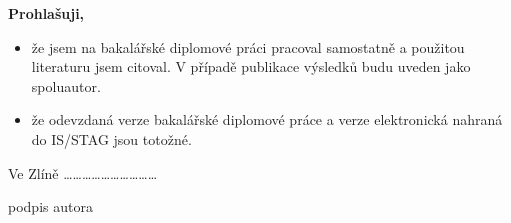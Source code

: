 {{	\bigskip
	
	
	\textbf{Prohlašuji,}
	
	\begin{itemize}
		\setlength{\parskip}{0pt}
		\setlength{\itemsep}{0pt}
		\item{že jsem na \ifbp bakalářské \else \ifdp diplomové \fi \fi práci pracoval samostatně a použitou literaturu jsem citoval. V případě publikace výsledků budu uveden jako spoluautor.}
		\item{že odevzdaná verze \ifbp bakalářské \else \ifdp diplomové \fi \fi práce a verze elektronická nahraná do IS/STAG jsou totožné.}
	\end{itemize}
	
	\bigskip
	
	Ve Zlíně \hspace{7.2cm}\dots\dots\dots\dots\dots\dots\dots\dots\dots\dots
	
	\hspace{10.4cm}podpis autora
}}

